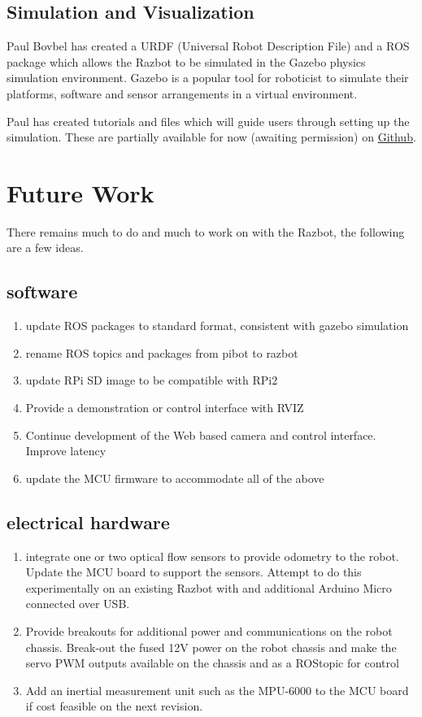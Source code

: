 \documentclass[12pt,titlepage,oneside]{memoir}
\begin{document}
\section{Simulation and Visualization}

Paul Bovbel has created a URDF (Universal Robot Description File) and a ROS package which allows the Razbot to be simulated in the Gazebo physics simulation environment. Gazebo is a popular tool for roboticist to simulate their platforms, software and sensor arrangements in a virtual environment.

Paul has created tutorials and files which will guide users through setting up the simulation. These are partially available for now (awaiting permission) on \href{https://github.com/Waterfox/razbot_tutorials}{Github}.



\chapter{Future Work}

There remains much to do and much to work on with the Razbot, the following are a few ideas.

\section{software}
\begin{enumerate}
\item update ROS packages to standard format, consistent with gazebo simulation
\item rename ROS topics and packages from pibot to razbot
\item update RPi SD image to be compatible with RPi2
\item Provide a demonstration or control interface with RVIZ
\item Continue development of the Web based camera and control interface. Improve latency
\item update the MCU firmware to accommodate all of the above
\end{enumerate}

\section{electrical hardware}
\begin{enumerate}
\item integrate one or two optical flow sensors to provide odometry to the robot. Update the MCU board to support the sensors. Attempt to do this experimentally on an existing Razbot with and additional Arduino Micro connected over USB.
\item Provide breakouts for additional power and communications on the robot chassis. Break-out the fused 12V power on the robot chassis and make the servo PWM outputs available on the chassis and as a ROStopic for control
\item Add an inertial measurement unit such as the MPU-6000 to the MCU board if cost feasible on the next revision.
\end{enumerate}
\end{document}

